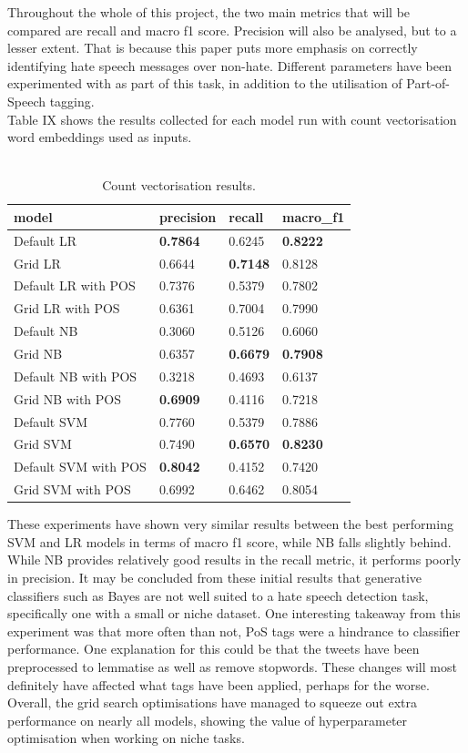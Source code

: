\documentclass[conference]{IEEEtran}
\begin{document}
Throughout the whole of this project, the two main metrics that will be compared are recall and macro f1 score. Precision will also be analysed, but to a lesser extent. That is because this paper puts more emphasis on correctly identifying hate speech messages over non-hate.  Different parameters have been experimented with as part of this task, in addition to the utilisation of Part-of-Speech tagging.\\

Table IX shows the results collected for each model run with count vectorisation word embeddings used as inputs.

\begin{table}[H]
\centering
\begin{tabular}{|l|l|l|l|}
\hline
model              & precision & recall & macro\_f1 \\ \hline
Default LR &	\textbf{0.7864} &	0.6245 &	\textbf{0.8222}\\ 
Grid LR &	0.6644 &	\textbf{0.7148} &	0.8128\\ 
Default LR with POS &	0.7376 &	0.5379 &	0.7802\\ 
Grid LR with POS	& 0.6361 &	0.7004 &	0.7990\\ \hline

Default NB &	0.3060 &	0.5126 &	0.6060\\ 
Grid NB	& 0.6357 &	\textbf{0.6679} &	\textbf{0.7908}\\ 
Default NB with POS &	0.3218 &	0.4693 &	0.6137\\ 
Grid NB with POS &	\textbf{0.6909} &	0.4116 &	0.7218\\ \hline

Default SVM	& 0.7760 &	0.5379 &	0.7886\\
Grid SVM &	0.7490 &	\textbf{0.6570} &	\textbf{0.8230}\\
Default SVM with POS &	\textbf{0.8042} &	0.4152 &	0.7420\\
Grid SVM with POS &	0.6992 &	0.6462 &	0.8054\\ \hline
\end{tabular}
\caption{\label{tab:count-vec-results}\\ Count vectorisation results.}
\end{table}

These experiments have shown very similar results between the best performing SVM and LR models in terms of macro f1 score, while NB falls slightly behind. While NB provides relatively good results in the recall metric, it performs poorly in precision. It may be concluded from these initial results that generative classifiers such as Bayes are not well suited to a hate speech detection task, specifically one with a small or niche dataset. 
One interesting takeaway from this experiment was that more often than not, PoS tags were a hindrance to classifier performance. One explanation for this could be that the tweets have been preprocessed to lemmatise as well as remove stopwords. These changes will most definitely have affected what tags have been applied, perhaps for the worse.
Overall, the grid search optimisations have managed to squeeze out extra performance on nearly all models, showing the value of hyperparameter optimisation when working on niche tasks.
\\
\end{document}
